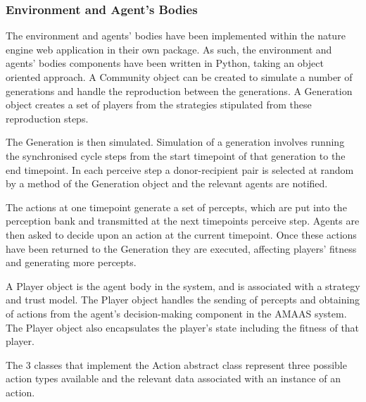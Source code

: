 \documentclass[]{final_report}
\begin{document}
\subsubsection{Environment and Agent's Bodies}
The environment and agents' bodies have been implemented within the nature engine web application in their own package. As such, the environment and agents' bodies components have been written in Python, taking an object oriented approach. A Community object can be created to simulate a number of generations and handle the reproduction between the generations. A Generation object creates a set of players from the strategies stipulated from these reproduction steps.\par 
The Generation is then simulated. Simulation of a generation involves running the synchronised cycle steps from the start timepoint of that generation to the end timepoint. In each perceive step a donor-recipient pair is selected at random by a method of the Generation object and the relevant agents are notified.\par 
The actions at one timepoint generate a set of percepts, which are put into the perception bank and transmitted at the next timepoints perceive step. Agents are then asked to decide upon an action at the current timepoint. Once these actions have been returned to the Generation they are executed, affecting players' fitness and generating more percepts.\par 
A Player object is the agent body in the system, and is associated with a strategy and trust model. The Player object handles the sending of percepts and obtaining of actions from the agent's decision-making component in the AMAAS system. The Player object also encapsulates the player's state including the fitness of that player.\par 
The 3 classes that implement the Action abstract class represent three possible action types available and the relevant data associated with an instance of an action.
\end{document}
